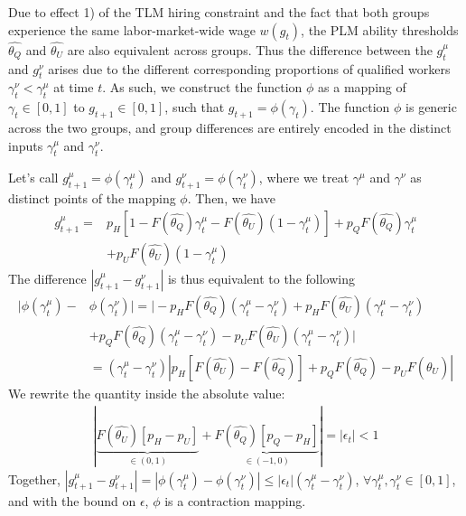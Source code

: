 \documentclass[sigconf]{acmart}
\theoremstyle{definition}
\begin{document}
Due to effect 1) of the TLM hiring constraint and the fact that both groups experience the same labor-market-wide wage $w(g_{t})$, the PLM ability thresholds $\widehat{\theta_Q}$ and $\widehat{\theta_U}$ are also equivalent across groups. Thus the difference between the $g^\mu_t$ and $g^\nu_t$ arises due to the different corresponding proportions of qualified workers $\gamma^\nu_t < \gamma^\mu_t$ at time $t$. As such, we construct the function $\phi$ as a mapping of $\gamma_t \in [0,1]$ to $g_{t+1} \in [0,1]$, such that $g_{t+1} = \phi(\gamma_t)$. The function $\phi$ is generic across the two groups, and group differences are entirely encoded in the distinct inputs $\gamma^\mu_t$ and $\gamma^\nu_t$. 

Let's call $g^\mu_{t+1} = \phi(\gamma^\mu_t)$ and $g^\nu_{t+1} = \phi(\gamma^\nu_t)$, where we treat $\gamma^\mu$ and $\gamma^\nu$ as distinct points of the mapping $\phi$. Then, we have
\begin{align}
g^\mu_{t+1} =& p_H[1-F(\widehat{\theta_Q})\gamma^\mu_t-F(\widehat{\theta_U})(1-\gamma_t^\mu)]+p_QF(\widehat{\theta_Q})\gamma^\mu_t\label{eq:recurse}\\&+p_UF(\widehat{\theta_U})(1-\gamma^\mu_t) \nonumber
\end{align}
The difference $|g^\mu_{t+1} - g^\nu_{t+1}|$ is thus equivalent to the following
\begin{align*}
|\phi(\gamma^\mu_t)- &\phi(\gamma^\nu_t)|= |-p_HF(\widehat{\theta_Q})(\gamma^\mu_t - \gamma^\nu_t)+p_HF(\widehat{\theta_U})(\gamma^\mu_t - \gamma^\nu_t) 
\\
&+p_QF(\widehat{\theta_Q})(\gamma^\mu_t - \gamma^\nu_t)-p_UF(\widehat{\theta_U})(\gamma^\mu_t - \gamma^\nu_t)|
\\
& = (\gamma^\mu_t - \gamma^\nu_t)|p_H[F(\widehat{\theta_U}) - F(\widehat{\theta_Q})]+p_QF(\widehat{\theta_Q})-p_UF(\widehat{\theta_U})|
\end{align*}
We rewrite the quantity inside the absolute value:
\begin{align*}
|\underbrace{F(\widehat{\theta_U})[p_H-p_U]}_{\in (0,1)}+\underbrace{F(\widehat{\theta_Q})[p_Q-p_H]}_{\in (-1, 0)}| = |\epsilon_t|<1
\end{align*}
Together, $|g^\mu_{t+1} - g^\nu_{t+1}| = |\phi(\gamma^\mu_t)- \phi(\gamma^\nu_t)| \le |\epsilon_t| (\gamma^\mu_t - \gamma^\nu_t)$, $\forall \gamma^\mu_{t}, \gamma^\nu_{t} \in [0,1]$, and with the bound on $\epsilon$, $\phi$ is a contraction mapping.
\end{document}
